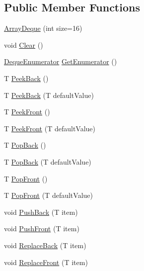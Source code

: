 \subsection*{Public Member Functions}
\begin{DoxyCompactItemize}
\item 
\hyperlink{classOTA_1_1Misc_1_1ArrayDeque_aae49a37f3c0334d54d689d43ed12b140}{Array\+Deque} (int size=16)
\item 
void \hyperlink{classOTA_1_1Misc_1_1ArrayDeque_aa71d36872f416feaa853788a7a7a7ef8}{Clear} ()
\item 
\hyperlink{structOTA_1_1Misc_1_1ArrayDeque_1_1DequeEnumerator}{Deque\+Enumerator} \hyperlink{classOTA_1_1Misc_1_1ArrayDeque_a286efa93125c0b3d12d3f0efe2461cef}{Get\+Enumerator} ()
\item 
T \hyperlink{classOTA_1_1Misc_1_1ArrayDeque_aac49f4e015ac8b35fb857f0608cf57b3}{Peek\+Back} ()
\item 
T \hyperlink{classOTA_1_1Misc_1_1ArrayDeque_ab632cf9800b663936caed6e780de5b35}{Peek\+Back} (T default\+Value)
\item 
T \hyperlink{classOTA_1_1Misc_1_1ArrayDeque_a71e5b95ff353a721913e917e4e196511}{Peek\+Front} ()
\item 
T \hyperlink{classOTA_1_1Misc_1_1ArrayDeque_a17db8ba7f85c73fc56636e54426bc915}{Peek\+Front} (T default\+Value)
\item 
T \hyperlink{classOTA_1_1Misc_1_1ArrayDeque_af811d706b0a93962687c58fd711c566f}{Pop\+Back} ()
\item 
T \hyperlink{classOTA_1_1Misc_1_1ArrayDeque_ac221a414b23c26a3ea0527c875a52c41}{Pop\+Back} (T default\+Value)
\item 
T \hyperlink{classOTA_1_1Misc_1_1ArrayDeque_a6f0c329a08b404a69b5f10beb143be91}{Pop\+Front} ()
\item 
T \hyperlink{classOTA_1_1Misc_1_1ArrayDeque_a2f068bb40c40c56a9b960ede42ad3410}{Pop\+Front} (T default\+Value)
\item 
void \hyperlink{classOTA_1_1Misc_1_1ArrayDeque_aa3515b9bc2e7e420420c2a66ecc97dfc}{Push\+Back} (T item)
\item 
void \hyperlink{classOTA_1_1Misc_1_1ArrayDeque_a2e9077337b78b4f2ef018efa7653ac12}{Push\+Front} (T item)
\item 
void \hyperlink{classOTA_1_1Misc_1_1ArrayDeque_aa7e48f00b7e104dd79d9b4ecec52a773}{Replace\+Back} (T item)
\item 
void \hyperlink{classOTA_1_1Misc_1_1ArrayDeque_a04ce15843ce064ad6236593ee168e704}{Replace\+Front} (T item)
\end{DoxyCompactItemize}
